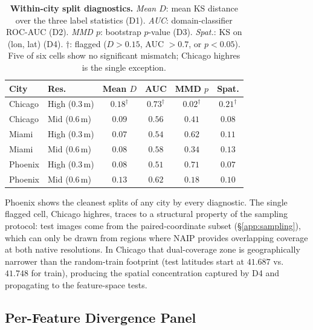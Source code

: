 \begin{table}[h]
\centering
\small
\setlength{\tabcolsep}{6pt}
\caption{
\textbf{Within-city split diagnostics.}
\textit{Mean $D$}: mean KS distance over the three label statistics (D1).
\textit{AUC}: domain-classifier ROC-AUC (D2).
\textit{MMD $p$}: bootstrap $p$-value (D3).
\textit{Spat.}: KS on (lon, lat) (D4).
$\dagger$: flagged ($D > 0.15$, AUC $> 0.7$, or $p < 0.05$).
Five of six cells show no significant mismatch; Chicago highres is the single exception.
}
\label{tab:splits-omnibus}
\begin{tabular}{llcccc}
\toprule
\textbf{City} & \textbf{Res.} & \textbf{Mean $D$} & \textbf{AUC} & \textbf{MMD $p$} & \textbf{Spat.} \\
\midrule
Chicago & High ($0.3$\,m) & $0.18^{\dagger}$ & $0.73^{\dagger}$ & $0.02^{\dagger}$ & $0.21^{\dagger}$ \\
Chicago & Mid  ($0.6$\,m) & $0.09$           & $0.56$           & $0.41$           & $0.08$           \\
Miami   & High ($0.3$\,m) & $0.07$           & $0.54$           & $0.62$           & $0.11$           \\
Miami   & Mid  ($0.6$\,m) & $0.08$           & $0.58$           & $0.34$           & $0.13$           \\
Phoenix & High ($0.3$\,m) & $0.08$           & $0.51$           & $0.71$           & $0.07$           \\
Phoenix & Mid  ($0.6$\,m) & $0.13$           & $0.62$           & $0.18$           & $0.10$           \\
\bottomrule
\end{tabular}
\end{table}

Phoenix shows the cleanest splits of any city by every diagnostic. The single flagged cell, Chicago highres, traces to a structural property of the sampling protocol: test images come from the paired-coordinate subset (\S\ref{app:sampling}), which can only be drawn from regions where NAIP provides overlapping coverage at both native resolutions. In Chicago that dual-coverage zone is geographically narrower than the random-train footprint (test latitudes start at $41.687$ vs.\ $41.748$ for train), producing the spatial concentration captured by D4 and propagating to the feature-space tests.

\subsection{Per-Feature Divergence Panel}
\label{app:splits-features}

